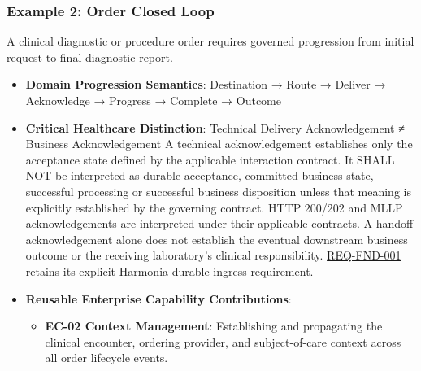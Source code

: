 \par\smallskip
{}\label{rad:tier-model:210}
\subsubsection*{Example 2: Order Closed Loop}
\label{rad:tier-model:212}

A clinical diagnostic or procedure order requires governed progression from initial request to final diagnostic report.

\label{rad:tier-model:214}

\begin{itemize}

\item
\textbf{Domain Progression Semantics}: Destination → Route → Deliver → Acknowledge → Progress → Complete → Outcome



\item
\textbf{Critical Healthcare Distinction}:  Technical Delivery Acknowledgement ≠  Business Acknowledgement A technical acknowledgement establishes only the acceptance state defined by the applicable interaction contract. It SHALL NOT be interpreted as durable acceptance, committed business state, successful processing or successful business disposition unless that meaning is explicitly established by the governing contract. HTTP 200/\allowbreak{}202 and MLLP acknowledgements are interpreted under their applicable contracts. A handoff acknowledgement alone does not establish the eventual downstream business outcome or the receiving laboratory's clinical responsibility. \href{https://github.com/fhirfactory/harmonia/blob/98410db60155198a75f74c79d98060070209faa1/docs/markdown/01-motivation/requirements-constraints/foundational-requirements.md\#req-fnd-001-durable-ingress-acceptance-boundary}{REQ-FND-001} retains its explicit Harmonia durable-ingress requirement.



\item
\textbf{Reusable Enterprise Capability Contributions}:


\begin{itemize}

\item
\textbf{EC-02 Context Management}: Establishing and propagating the clinical encounter, ordering provider, and subject-of-care context across all order lifecycle events.




\end{itemize}
\end{itemize}
